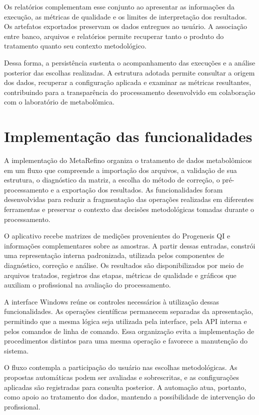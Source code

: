 Os relatórios complementam esse conjunto ao apresentar as informações da execução, as métricas de qualidade e os limites de interpretação dos resultados. Os artefatos exportados preservam os dados entregues ao usuário. A associação entre banco, arquivos e relatórios permite recuperar tanto o produto do tratamento quanto seu contexto metodológico.

Dessa forma, a persistência sustenta o acompanhamento das execuções e a análise posterior das escolhas realizadas. A estrutura adotada permite consultar a origem dos dados, recuperar a configuração aplicada e examinar as métricas resultantes, contribuindo para a transparência do processamento desenvolvido em colaboração com o laboratório de metabolômica.


\section{Implementação das funcionalidades}
\label{sec:implementacao-funcionalidades}

A implementação do MetaRefino organiza o tratamento de dados metabolômicos em um fluxo que compreende a importação dos arquivos, a validação de sua estrutura, o diagnóstico da matriz, a escolha do método de correção, o pré-processamento e a exportação dos resultados. As funcionalidades foram desenvolvidas para reduzir a fragmentação das operações realizadas em diferentes ferramentas e preservar o contexto das decisões metodológicas tomadas durante o processamento.

O aplicativo recebe matrizes de medições provenientes do Progenesis QI e informações complementares sobre as amostras. A partir dessas entradas, constrói uma representação interna padronizada, utilizada pelos componentes de diagnóstico, correção e análise. Os resultados são disponibilizados por meio de arquivos tratados, registros das etapas, métricas de qualidade e gráficos que auxiliam o profissional na avaliação do processamento.

A interface Windows reúne os controles necessários à utilização dessas funcionalidades. As operações científicas permanecem separadas da apresentação, permitindo que a mesma lógica seja utilizada pela interface, pela API interna e pelos comandos de linha de comando. Essa organização evita a implementação de procedimentos distintos para uma mesma operação e favorece a manutenção do sistema.

O fluxo contempla a participação do usuário nas escolhas metodológicas. As propostas automáticas podem ser avaliadas e sobrescritas, e as configurações aplicadas são registradas para consulta posterior. A automação atua, portanto, como apoio ao tratamento dos dados, mantendo a possibilidade de intervenção do profissional.

